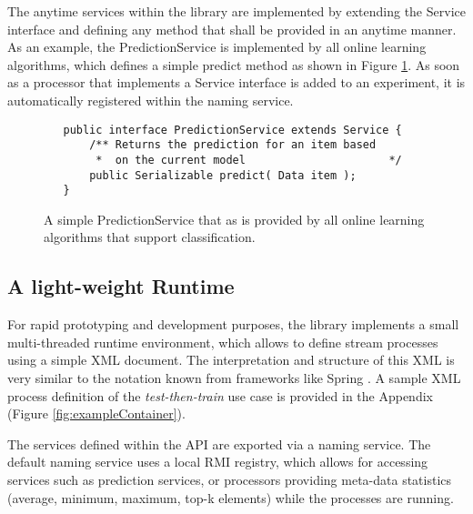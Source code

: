 The anytime services within the \streams library are implemented by
extending the {\ttfamily Service} interface and defining any method
that shall be provided in an anytime manner. As an example, the
{\ttfamily PredictionService} is implemented by all online learning
algorithms, which defines a simple {\ttfamily predict} method as shown in
Figure \ref{fig:predictionService}. As soon as a processor that
implements a {\ttfamily Service} interface is added to an experiment,
it is automatically registered within the naming service.

\begin{figure}[h!]
\footnotesize
\begin{lstlisting}
   public interface PredictionService extends Service {
       /** Returns the prediction for an item based 
        *  on the current model                      */
       public Serializable predict( Data item );
   }
\end{lstlisting}
\caption{\label{fig:predictionService}A simple {\ttfamily
    PredictionService} that as is provided by all online learning
  algorithms that support classification.}
\end{figure}


%

\subsection{A light-weight \streams Runtime}
For rapid prototyping and development purposes, the \streams library
implements a small multi-threaded runtime environment, which allows to
define stream processes using a simple XML document. The
interpretation and structure of this XML is very similar to the
notation known from frameworks like Spring \cite{springframework}. A
sample XML process definition of the {\em test-then-train} use case is
provided in the Appendix (Figure \ref{fig:exampleContainer}).

The services defined within the \streams API are exported via a naming
service. The default naming service uses a local RMI registry, which
allows for accessing services such as prediction services, or
processors providing meta-data statistics (average, minimum, maximum,
top-k elements) while the processes are running.
